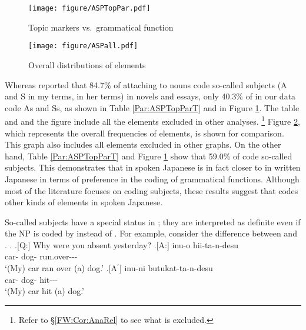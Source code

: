 \begin{figure}

	\texttt{[image: figure/ASPTopPar.pdf]}
	\caption{Topic markers vs.~grammatical function}
	\label{Par:ASPTopParF}

\end{figure}
\begin{figure}

	\texttt{[image: figure/ASPall.pdf]}
	\caption{Overall distributions of elements}
	\label{Par:ASPallF}

\end{figure}


Whereas  reported that
84.7\% of  attaching to nouns code so-called subjects (A and S in my terms,  in her terms) in novels and essays,
only 40.3\% of  in our data code As and Ss,
as shown in Table \ref{Par:ASPTopParT} and in Figure \ref{Par:ASPTopParF}.
The table and and the figure include all the elements excluded in other analyses.%
 \footnote{
 Refer to \S \ref{FW:Cor:AnaRel} to see what is excluded.
 }
Figure \ref{Par:ASPallF},
which represents the overall frequencies of elements,
is shown for comparison.
This graph also includes all elements excluded in other graphs.
On the other hand, Table \ref{Par:ASPTopParT} and Figure \ref{Par:ASPTopParF} show that
59.0\% of  code so-called subjects.
This demonstrates that
 in spoken Japanese is in fact closer to  in written Japanese in terms of preference in the coding of grammatical functions. %
Although most of the literature focuses on  coding subjects,
these results suggest that  codes other kinds of elements in spoken Japanese.

So-called subjects have a special status in ;
they are interpreted as definite even if the NP is coded by  instead of .
For example,
consider the difference between \Next and \NNext.
%
\ex.
 \a.[Q:] Why were you absent yesterday?
 \bg.[A:]  inu-o hii-ta-n-desu \\
		car- dog- run.over--- \\
		`(My) car ran over (a) dog.'
 \bg.[A$^{\prime}$]  inu-ni butukat-ta-n-desu \\
   car- dog- hit--- \\
   `(My) car hit (a) dog.'
	
